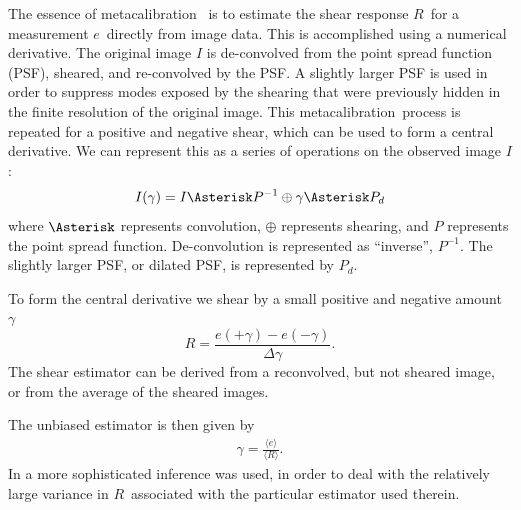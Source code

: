 \documentclass[usegraphicx,usenatbib]{mn2e}
\newcommand{\est}{$e$}
\newcommand{\mest}{e}
\newcommand{\mcal}{metacalibration}
\newcommand{\mcalR}{$R$}
\begin{document}
The essence of \mcal\ \citep{HuffMcal} is to estimate the shear response
\mcalR\ for a measurement \est\ directly from image data.  This is
accomplished using a numerical derivative.  The original image $I$ is
de-convolved from the point spread function (PSF), sheared, and re-convolved
by the PSF.  A slightly larger PSF is used in order to suppress modes 
exposed by the shearing that were previously hidden in the finite
resolution of the original image.  This \mcal\ process is repeated for a
positive and negative shear, which can be used to form a central derivative.
We can represent this as a series of operations on the observed image $I$:
\begin{equation}
    I(\gamma) = I \Asterisk P^{-1} \oplus \gamma \Asterisk P_{d}
\end{equation}
where $\Asterisk$ represents convolution, $\oplus$ represents shearing,
and $P$ represents the point spread function.  De-convolution
is represented as ``inverse'', $P^{-1}$.  The slightly larger PSF, or
dilated PSF, is represented by $P_{d}$.

To form the central derivative we shear by a small positive and negative
amount $\gamma$
\begin{equation} \label{eq:Rnum}
    R = \frac{\mest(+\gamma) - \mest(-\gamma)}{\Delta \gamma}.
\end{equation}
The shear estimator can be derived from a reconvolved, but not sheared image,
or from the average of the sheared images.


The unbiased estimator is then given by
\begin{align}
    \gamma = \frac{\langle \mest \rangle}{\langle \mbox{\mcalR} \rangle}.
\end{align}
In \cite{HuffMcal} a more sophisticated inference was used, in order to deal
with the relatively large variance in \mcalR\ associated with the particular
estimator used therein.
\end{document}
